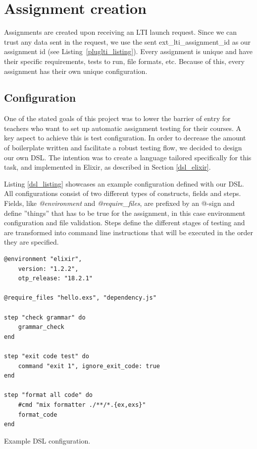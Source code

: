 \section{Assignment creation}

Assignments are created upon receiving an LTI launch request. Since we can trust any data sent in the request, we use the sent ext\_lti\_assignment\_id as our assignment id (see Listing~\ref{pluglti_listing}). Every assignment is unique and have their specific requirements, tests to run, file formats, etc. Because of this, every assignment has their own unique configuration.

\subsection{Configuration}
One of the stated goals of this project was to lower the barrier of entry for teachers who want to set up automatic assignment testing for their courses. A key aspect to achieve this is test configuration. In order to decrease the amount of boilerplate written and facilitate a robust testing flow, we decided to design our own DSL. The intention was to create a language tailored specifically for this task, and implemented in Elixir, as described in Section \ref{dsl_elixir}.

Listing \ref{dsl_listing} showcases an example configuration defined with our DSL. All configurations consist of two different types of constructs, fields and steps. Fields, like \textit{@environment} and \textit{@require\_files}, are prefixed by an @-sign and define ''things'' that has to be true for the assignment, in this case environment configuration and file validation. Steps define the different stages of testing and are transformed into command line instructions that will be executed in the order they are specified.  

\begin{listing}
\begin{verbatim}
@environment "elixir",
	version: "1.2.2",
	otp_release: "18.2.1"

@require_files "hello.exs", "dependency.js"

step "check grammar" do
	grammar_check
end

step "exit code test" do
	command "exit 1", ignore_exit_code: true
end

step "format all code" do
	#cmd "mix formatter ./**/*.{ex,exs}"
	format_code
end
\end{verbatim}
\caption{Example DSL configuration.}
\label{dsl_listing}
\end{listing}

